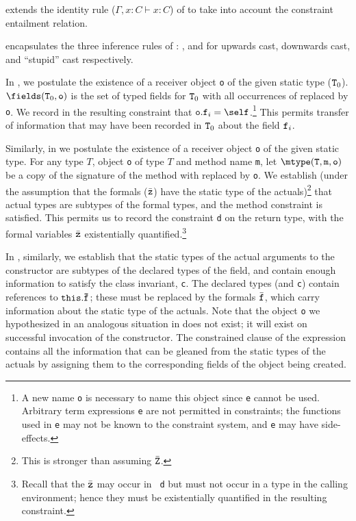 \TVar{} extends the identity rule ($\Gamma, x:C \vdash x:C$) of
\FJ{} to take into account the constraint entailment relation.

\TCast{} encapsulates the three inference rules of \FJ{} :
\TUCast{}, \TDCast{} and \TSCast{} for upwards cast, downwards cast, and ``stupid'' cast respectively. 


In \TField, we postulate the existence of a receiver object {\tt o} of
the given static type (${\tt T}_0$). $\fields({\tt T}_0,{\tt o})$ is
the set of typed fields for ${\tt T}_0$ with all occurrences of 
\this{} replaced  by {\tt o}. We record in the resulting
constraint that ${\tt o.f}_i=\self$.\footnote{A new name {\tt o} is
necessary to name this object since {\tt e} cannot be used. Arbitrary
term expressions {\tt e} are not permitted in constraints; the
functions used in {\tt e} may not be known to the constraint system,
and {\tt e} may have side-effects.}  This permits transfer of
information that may have been recorded in ${\tt T}_0$ about the field
${\tt f}_i$. 

Similarly, in \TInvk{} we postulate the existence of a receiver object
{\tt o} of the given static type. For any type $T$, object {\tt o} of
type $T$ and method name {\tt m}, let $\mtype({\tt T},{\tt m},{\tt
o})$ be a copy of the signature of the method with \this{} replaced by
{\tt o}. We establish (under the assumption that the formals
($\bar{\tt z}$) have the static type of the actuals)\footnote{This is
stronger than assuming $\bar{\tt Z}$.}  that actual types are subtypes
of the formal types, and the method constraint is satisfied. This
permits us to record the constraint {\tt d} on the return type, with
the formal variables $\bar{\tt z}$ existentially
quantified.\footnote{Recall that the $\bar{\tt z}$ may occur in {\tt
d} but must not occur in a type in the calling environment; hence they
must be existentially quantified in the resulting constraint.}

In \TNew, similarly, we establish that the static types of the actual
arguments to the constructor are subtypes of the declared types of the
field, and contain enough information to satisfy the class invariant,
{\tt c}. The declared types (and {\tt c}) contain references to ${\tt
this.\bar{\tt f}}$; these must be replaced by the formals $\bar{\tt
f}$, which carry information about the static type of the
actuals. Note that the object {\tt o} we hypothesized in an analogous
situation in \TInvk{} does not exist; it will exist on successful
invocation of the constructor. The constrained clause of the \new{}
expression contains all the information that can be gleaned from the
static types of the actuals by assigning them to the corresponding
fields of the object being created.

